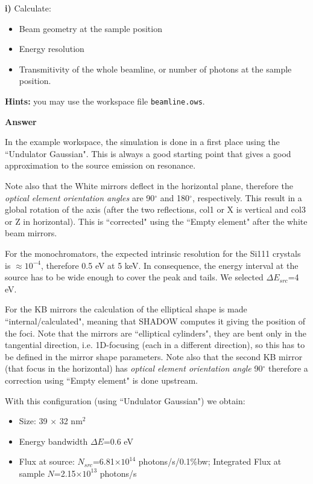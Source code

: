 \begin{questionsbox}
\textbf{i)} Calculate:
\begin{itemize}
    \item Beam geometry at the sample position
    \item Energy resolution
    \item Transmitivity of the whole beamline, or number of photons at the sample position.
\end{itemize}
\end{questionsbox}

\begin{hintsbox}
\textbf{Hints:} you may use the workspace file {\tt beamline.ows}.
\end{hintsbox}

\begin{answersbox}
\textbf{Answer}

In the example workspace, the simulation is done in a first place using the ``Undulator Gaussian". This is always a good starting point that gives a good approximation to the source emission on resonance.

Note also that the White mirrors deflect in the horizontal plane, therefore the {\it optical element orientation angles} are 90$^\circ$ and 180$^\circ$, respectively. This result in a global rotation of the axis (after the two reflections, col1 or X is vertical and col3 or Z in horizontal). This is ``corrected" using the ``Empty element" after the white beam mirrors.

For the monochromators, the expected intrinsic resolution for the Si111 crystals is $\approx 10^{-4}$, therefore 0.5 eV at 5 keV. In consequence, the energy interval at the source has to be wide enough to cover the peak and tails. We selected $\Delta E_{src}$=4 eV.

For the KB mirrors the calculation of the elliptical shape is made ``internal/calculated", meaning that SHADOW computes it giving the position of the foci. Note that the mirrors are ``elliptical cylinders", they are bent only in the tangential direction, i.e. 1D-focusing (each in a different direction), so this has to be defined in the mirror shape parameters. Note also that the second KB mirror (that focus in the horizontal) has {\it optical element orientation angle} 90$^\circ$ therefore a correction using ``Empty element" is done upstream.

With this configuration (using ``Undulator Gaussian") we obtain:
\begin{itemize}
    \item Size: 39 $\times$ 32 nm$^2$
    \item Energy bandwidth $\Delta E$=0.6 eV
    \item Flux at source: $N_{src}$=6.81$\times 10^{14}$ photons/s/0.1\%bw; Integrated Flux at sample $N$=2.15$\times 10^{13}$ photons/s
\end{itemize}


\end{answersbox}

